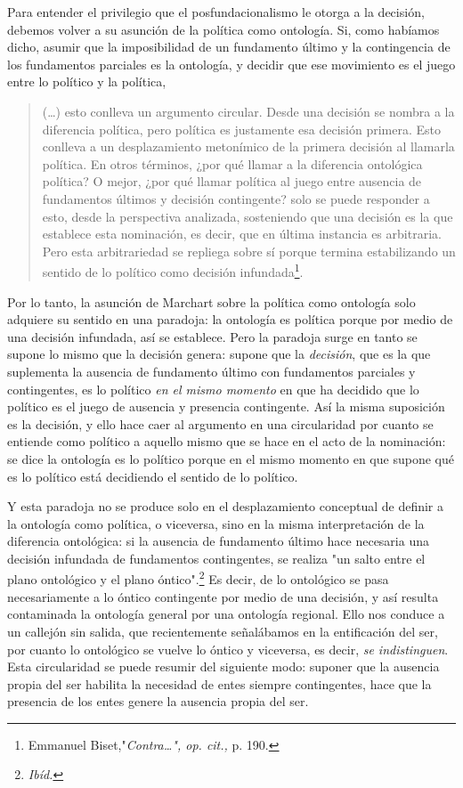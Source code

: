 \documentclass{book}
\begin{document}
Para entender el privilegio que el posfundacionalismo le otorga a la
decisión, debemos volver a su asunción de la política como ontología.
Si, como habíamos dicho, asumir que la imposibilidad de un fundamento
último y la contingencia de los fundamentos parciales es la ontología, y
decidir que ese movimiento es el juego entre lo político y la política,

\begin{quote}
(\dots) esto conlleva un argumento circular. Desde una decisión se
nombra a la diferencia política, pero política es justamente esa
decisión primera. Esto conlleva a un desplazamiento metonímico de la
primera decisión al llamarla política. En otros términos, ¿por qué
llamar a la diferencia ontológica política? O mejor, ¿por qué llamar
política al juego entre ausencia de fundamentos últimos y decisión
contingente? solo se puede responder a esto, desde la perspectiva
analizada, sosteniendo que una decisión es la que establece esta
nominación, es decir, que en última instancia es arbitraria. Pero esta
arbitrariedad se repliega sobre sí porque termina estabilizando un
sentido de lo político como decisión infundada\footnote{Emmanuel
  Biset,"\emph{Contra\ldots", op. cit.,} p. 190.}.
\end{quote}

Por lo tanto, la asunción de Marchart sobre la política como ontología
solo adquiere su sentido en una paradoja: la ontología es política
porque por medio de una decisión infundada, así se establece. Pero la
paradoja surge en tanto se supone lo mismo que la decisión genera:
supone que la \emph{decisión}, que es la que suplementa la ausencia de
fundamento último con fundamentos parciales y contingentes, es lo
político \emph{en el mismo momento} en que ha decidido que lo político
es el juego de ausencia y presencia contingente. Así la misma suposición
es la decisión, y ello hace caer al argumento en una circularidad por
cuanto se entiende como político a aquello mismo que se hace en el acto
de la nominación: se dice la ontología es lo político porque en el mismo
momento en que supone qué es lo político está decidiendo el sentido de
lo político.

Y esta paradoja no se produce solo en el desplazamiento conceptual de
definir a la ontología como política, o viceversa, sino en la misma
interpretación de la diferencia ontológica: si la ausencia de fundamento
último hace necesaria una decisión infundada de fundamentos
contingentes, se realiza "un salto entre el plano ontológico y el plano
óntico".\footnote{\emph{Ibíd.}} Es decir, de lo ontológico se pasa
necesariamente a lo óntico contingente por medio de una decisión, y así
resulta contaminada la ontología general por una ontología regional.
Ello nos conduce a un callejón sin salida, que recientemente señalábamos
en la entificación del ser, por cuanto lo ontológico se vuelve lo óntico
y viceversa, es decir, \emph{se indistinguen}. Esta circularidad se
puede resumir del siguiente modo: suponer que la ausencia propia del ser
habilita la necesidad de entes siempre contingentes, hace que la
presencia de los entes genere la ausencia propia del ser.
\end{document}
